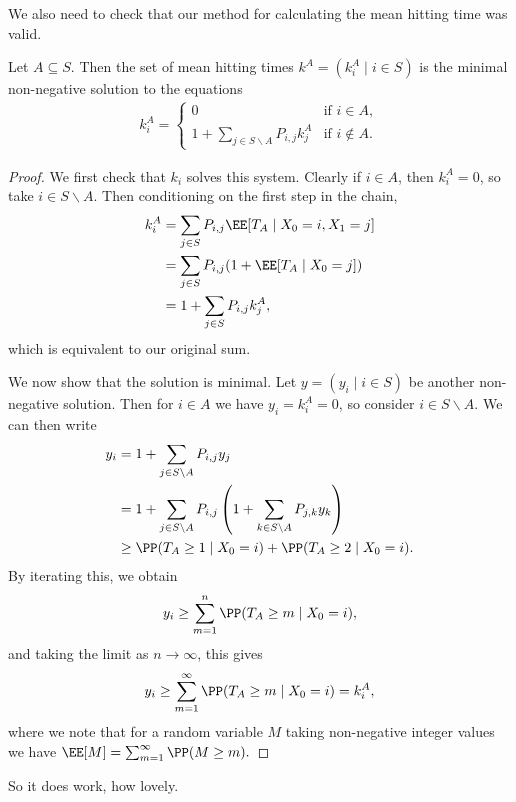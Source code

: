 \documentclass[a4paper]{scrartcl}
\begin{document}
We also need to check that our method for calculating the mean hitting time was valid.

\begin{theorem}
	Let $A \subseteq S$. Then the set of mean hitting times $k^A = (k_i^A \mid i \in S)$ is the minimal non-negative solution to the equations
	\begin{align*}
		k_i^A = \begin{cases}
			0 &\mbox{if } i  \in A, \\
			1 + \sum_{j \in S\backslash A} P_{i, j} k_j^A &\mbox{if } i \not \in A.
		   \end{cases}
	\end{align*}
\end{theorem}
\begin{proof}
	We first check that $k_i$ solves this system. Clearly if $i \in A$, then $k_i^A = 0$, so take $i \in S \backslash A$. Then conditioning on the first step in the chain,
	\begin{align*}
		k_i^A &= \sum_{j \in S} P_{i, j}\EE[T_A \mid X_0 = i, X_1 = j]  \\
		&= \sum_{j \in S} P_{i, j}(1 + \EE[T_A \mid X_0 = j]) \\
		&= 1 + \sum_{j \in S} P_{i, j} k_j^A, 	
	\end{align*}
	which is equivalent to our original sum.

	We now show that the solution is minimal. Let $y = (y_i \mid i \in S)$ be another non-negative solution. Then for $i \in A$ we have $y_i = k_i^A = 0$, so consider $i \in S \backslash A$. We can then write
	\begin{align*}
	y_i &= 1 + \sum_{j \in S \backslash A} P_{i, j} y_j  \\
	&= 1 + \sum_{j \in S \backslash A} P_{i, j}\left(1 + \sum_{k \in S \backslash A} P_{j, k} y_k\right) \\
	&\geq \PP(T_A \geq 1 \mid X_0 = i) + \PP(T_A \geq 2 \mid X_0 = i).
	\end{align*}
	By iterating this, we obtain
	$$
	y_i \geq \sum_{m = 1}^n \PP(T_A \geq m \mid X_0 = i),
	$$
	and taking the limit as $n \rightarrow \infty$, this gives
	$$
	y_i \geq \sum_{m = 1}^{\infty} \PP(T_A \geq m \mid X_0 = i) = k_i^A,
	$$
	where we note that for a random variable $M$ taking non-negative integer values we have $\EE[M] = \sum_{m = 1}^{\infty} \PP(M \geq m).$
\end{proof}

So it does work, how lovely.
\end{document}
